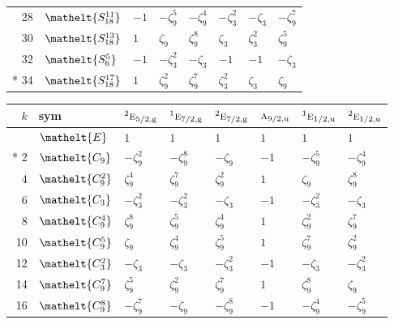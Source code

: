 \documentclass[10pt,a4paper]{article}
\numberwithin{equation}{section}
\newcommand{\eltfont}[1]{{\let\sigma\eltsigma\mathelt{#1}}}
\newcommand{\irr}[1]{\text{\normalfont\scshape #1}}
\newcommand{\conjpair}[1]{{}^{#1}}
\newcommand{\cls}[1]{\eltfont{#1}}
\newcommand{\ptag}[1]{\mathrm{#1}}
\newcommand{\rootunity}[1]{\zeta_{#1}}
\begin{document}
{\begin{longtable}{@{}rlllllll@{}}
28 & $\cls{S_{18}^{11}}$ & $-1$ & $-\rootunity{9}^{5}$ & $-\rootunity{9}^{4}$ & $-\rootunity{3}^{2}$ & $-\rootunity{3}$ & $-\rootunity{9}^{7}$\\
30 & $\cls{S_{18}^{13}}$ & $1$ & $\rootunity{9}$ & $\rootunity{9}^{8}$ & $\rootunity{3}$ & $\rootunity{3}^{2}$ & $\rootunity{9}^{5}$\\
32 & $\cls{S_{6}^{5}}$ & $-1$ & $-\rootunity{3}^{2}$ & $-\rootunity{3}$ & $-1$ & $-1$ & $-\rootunity{3}$\\*
34 & $\cls{S_{18}^{17}}$ & $1$ & $\rootunity{9}^{2}$ & $\rootunity{9}^{7}$ & $\rootunity{3}^{2}$ & $\rootunity{3}$ & $\rootunity{9}$\\
\bottomrule\end{longtable}}
{\small\setlength{\tabcolsep}{4pt}
\begin{longtable}{@{}rlllllll@{}}\toprule
$k$ & sym & $\conjpair{2}\irr{e}_{5/2,\ptag{g}}$ & $\conjpair{1}\irr{e}_{7/2,\ptag{g}}$ & $\conjpair{2}\irr{e}_{7/2,\ptag{g}}$ & $\irr{a}_{9/2,\ptag{u}}$ & $\conjpair{1}\irr{e}_{1/2,\ptag{u}}$ & $\conjpair{2}\irr{e}_{1/2,\ptag{u}}$\\\midrule\endhead
\bottomrule\endfoot\endlastfoot
0 & $\cls{E}$ & $1$ & $1$ & $1$ & $1$ & $1$ & $1$\\*
2 & $\cls{C_{9}}$ & $-\rootunity{9}^{2}$ & $-\rootunity{9}^{8}$ & $-\rootunity{9}$ & $-1$ & $-\rootunity{9}^{5}$ & $-\rootunity{9}^{4}$\\
4 & $\cls{C_{9}^{2}}$ & $\rootunity{9}^{4}$ & $\rootunity{9}^{7}$ & $\rootunity{9}^{2}$ & $1$ & $\rootunity{9}$ & $\rootunity{9}^{8}$\\
6 & $\cls{C_{3}}$ & $-\rootunity{3}^{2}$ & $-\rootunity{3}^{2}$ & $-\rootunity{3}$ & $-1$ & $-\rootunity{3}^{2}$ & $-\rootunity{3}$\\
8 & $\cls{C_{9}^{4}}$ & $\rootunity{9}^{8}$ & $\rootunity{9}^{5}$ & $\rootunity{9}^{4}$ & $1$ & $\rootunity{9}^{2}$ & $\rootunity{9}^{7}$\\
10 & $\cls{C_{9}^{5}}$ & $\rootunity{9}$ & $\rootunity{9}^{4}$ & $\rootunity{9}^{5}$ & $1$ & $\rootunity{9}^{7}$ & $\rootunity{9}^{2}$\\
12 & $\cls{C_{3}^{2}}$ & $-\rootunity{3}$ & $-\rootunity{3}$ & $-\rootunity{3}^{2}$ & $-1$ & $-\rootunity{3}$ & $-\rootunity{3}^{2}$\\
14 & $\cls{C_{9}^{7}}$ & $\rootunity{9}^{5}$ & $\rootunity{9}^{2}$ & $\rootunity{9}^{7}$ & $1$ & $\rootunity{9}^{8}$ & $\rootunity{9}$\\
16 & $\cls{C_{9}^{8}}$ & $-\rootunity{9}^{7}$ & $-\rootunity{9}$ & $-\rootunity{9}^{8}$ & $-1$ & $-\rootunity{9}^{4}$ & $-\rootunity{9}^{5}$\\

\end{longtable}}
\end{document}
